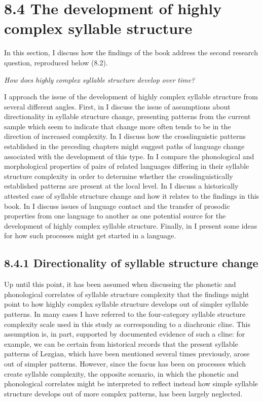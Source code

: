 \section{8.4 The development of highly complex syllable structure}

  In this section, I discuss how the findings of the book address the second research question, reproduced below (8.2).

\ea\label{ex:(8.2)}
   \textit{How} \textit{does} \textit{highly} \textit{complex} \textit{syllable} \textit{structure} \textit{develop} \textit{over} \textit{time?}
\z

  I approach the issue of the development of highly complex syllable structure from several different angles. First, in  I discuss the issue of assumptions about directionality in syllable structure change, presenting patterns from the current sample which seem to indicate that change more often tends to be in the direction of increased complexity. In  I discuss how the crosslinguistic patterns established in the preceding chapters might suggest paths of language change associated with the development of this type. In  I compare the phonological and morphological properties of pairs of related languages differing in their syllable structure complexity in order to determine whether the crosslinguistically established patterns are present at the local level. In  I discuss a historically attested case of syllable structure change and how it relates to the findings in this book. In  I discuss issues of language contact and the transfer of prosodic properties from one language to another as one potential source for the development of highly complex syllable structure. Finally, in  I present some ideas for how such processes might get started in a language.

\subsection{8.4.1 Directionality of syllable structure change}

  Up until this point, it has been assumed when discussing the phonetic and phonological correlates of syllable structure complexity that the findings might point to how highly complex syllable structure develops out of simpler syllable patterns. In many cases I have referred to the four-category syllable structure complexity scale used in this study as corresponding to a diachronic cline. This assumption is, in part, supported by documented evidence of such a cline: for example, we can be certain from historical records that the present syllable patterns of Lezgian, which have been mentioned several times previously, arose out of simpler patterns. However, since the focus has been on processes which create syllable complexity, the opposite scenario, in which the phonetic and phonological correlates might be interpreted to reflect instead how simple syllable structure develops out of more complex patterns, has been largely neglected.

